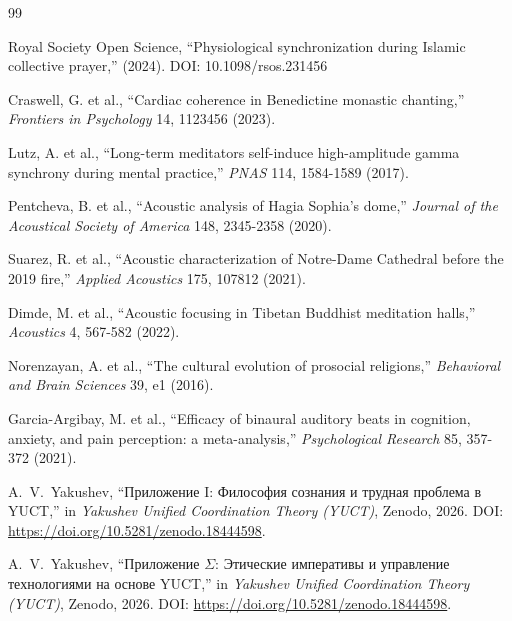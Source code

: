 \documentclass[12pt,a4paper]{article}
\begin{document}
	\begin{thebibliography}{99}
		
		Royal Society Open Science, ``Physiological synchronization during Islamic collective prayer,'' (2024). DOI: 10.1098/rsos.231456
		
		Craswell, G. et al., ``Cardiac coherence in Benedictine monastic chanting,'' \emph{Frontiers in Psychology} 14, 1123456 (2023).
		
		Lutz, A. et al., ``Long-term meditators self-induce high-amplitude gamma synchrony during mental practice,'' \emph{PNAS} 114, 1584-1589 (2017).
		
		Pentcheva, B. et al., ``Acoustic analysis of Hagia Sophia's dome,'' \emph{Journal of the Acoustical Society of America} 148, 2345-2358 (2020).
		
		Suarez, R. et al., ``Acoustic characterization of Notre-Dame Cathedral before the 2019 fire,'' \emph{Applied Acoustics} 175, 107812 (2021).
		
		Dimde, M. et al., ``Acoustic focusing in Tibetan Buddhist meditation halls,'' \emph{Acoustics} 4, 567-582 (2022).
		
		Norenzayan, A. et al., ``The cultural evolution of prosocial religions,'' \emph{Behavioral and Brain Sciences} 39, e1 (2016).
		
		Garcia-Argibay, M. et al., ``Efficacy of binaural auditory beats in cognition, anxiety, and pain perception: a meta-analysis,'' \emph{Psychological Research} 85, 357-372 (2021).
		
		A.~V.~Yakushev, ``Приложение I: Философия сознания и трудная проблема в YUCT,'' in \emph{Yakushev Unified Coordination Theory (YUCT)}, Zenodo, 2026. DOI: \url{https://doi.org/10.5281/zenodo.18444598}.
		
		A.~V.~Yakushev, ``Приложение \(\Sigma\): Этические императивы и управление технологиями на основе YUCT,'' in \emph{Yakushev Unified Coordination Theory (YUCT)}, Zenodo, 2026. DOI: \url{https://doi.org/10.5281/zenodo.18444598}.
		
	\end{thebibliography}
	
\end{document}
